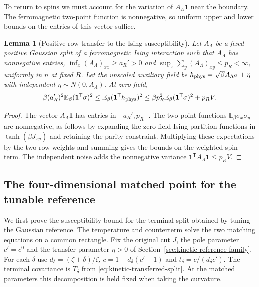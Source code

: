 \documentclass[11pt]{article}
\newtheorem{lemma}[theorem]{Lemma}
\theoremstyle{definition}
\newcommand{\one}{\mathbf 1}
\newcommand{\E}{\mathbb E}
\begin{document}
To return to spins we must account for the variation of
\(A_\Lambda\one\) near the boundary. The ferromagnetic two-point
function is nonnegative, so uniform upper and lower bounds on
the entries of this vector suffice.

\begin{lemma}[Positive-row transfer to the Ising susceptibility]
\label{lem:spin}
Let \(A_\Lambda\) be a fixed positive Gaussian split of a
ferromagnetic Ising interaction such that \(A_\Lambda\) has
nonnegative entries, \(\inf_x(A_\Lambda)_{xx}\ge a_R'>0\)
and \(\sup_x\sum_y(A_\Lambda)_{xy}\le p_R<\infty\), uniformly in
\(n\) at fixed \(R\). Let the unscaled auxiliary field be
\(h_{\rm phys}=\sqrt\beta A_\Lambda\sigma+\eta\) with independent
\(\eta\sim N(0,A_\Lambda)\). At zero field,
\begin{equation}
 \beta (a_R')^2 \E_\beta(\one^{\mathsf T}\sigma)^2
 \le \E_\beta(\one^{\mathsf T}h_{\rm phys})^2
 \le \beta p_R^2 \E_\beta(\one^{\mathsf T}\sigma)^2+p_R V.
\end{equation}
\end{lemma}

\begin{proof}
The vector \(A_\Lambda\one\) has entries in \([a_R',p_R]\).
The two-point functions \(\E_\beta\sigma_x\sigma_y\) are
nonnegative, as follows by expanding the zero-field Ising
partition functions in \(\tanh(\beta J_{xy})\) and retaining
the parity constraint. Multiplying these expectations by
the two row weights and summing gives the bounds on the
weighted spin term. The independent noise adds the
nonnegative variance \(\one^{\mathsf T}A_\Lambda\one\le p_R V\).
\end{proof}

\subsection{The four-dimensional matched point for the tunable reference}
\label{sec:d4-alternative-theorem}

We first prove the susceptibility bound for the terminal split
obtained by tuning the Gaussian reference. The temperature and
counterterm solve the two matching equations on a common rectangle.
Fix the original cut \(J\), the pole parameter \(c'=c^0\) and the
transfer parameter \(\eta>0\) of Section~\ref{sec:kinetic-reference-family}.
For each \(\delta\) use \(d_\delta=(\zeta+\delta)/\zeta\),
\(c=1+d_\delta(c'-1)\) and \(t_\delta=c/(d_\delta c')\). The
terminal covariance is \(T_\delta\) from \eqref{eq:kinetic-transferred-split}.
At the matched parameters this decomposition is held fixed when taking
the curvature.
\end{document}

